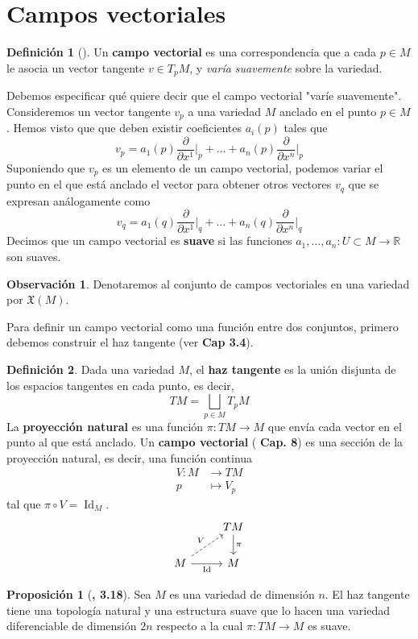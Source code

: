 \documentclass[spanish]{book}
\theoremstyle{definition}
\newtheorem*{defn}{Definición}
\newtheorem*{prop}{Proposición}
\newtheorem*{obs}{Observación}
\newcommand{\R}{\mathbb{R}}
\DeclareMathOperator{\Id}{Id}
\begin{document}
	\section{Campos vectoriales}\label{sec:campos-vectoriales}
	\begin{defn}[\cite{ONeill}]
		Un \textbf{campo vectorial} es una correspondencia que a cada $p\in M$ le asocia un vector tangente $v\in T_pM$, y \textit{varía suavemente} sobre la variedad.
	\end{defn}
	Debemos especificar qué quiere decir que el campo vectorial "varíe suavemente". Consideremos un vector tangente $v_p$ a una variedad $M$ anclado en el punto $p\in M$. Hemos visto que que deben existir coeficientes $a_i(p)$ tales que
	\[v_p=a_1(p)\frac{\partial}{\partial x^1}\Big|_p+\ldots+a_n(p)\frac{\partial}{\partial x^n}\Big|_p\]
	Suponiendo que $v_p$ es un elemento de un campo vectorial, podemos variar el punto en el que está anclado el vector para obtener otros vectores $v_q$ que se expresan análogamente como
	\[v_q=a_1(q)\frac{\partial}{\partial x^1}\Big|_q+\ldots+a_n(q)\frac{\partial}{\partial x^n}\Big|_q\]
	Decimos que un campo vectorial es \textbf{suave} si las funciones $a_1,\ldots,a_n:U\subset M\to\R$ son suaves.
	\begin{obs}
		Denotaremos al conjunto de campos vectoriales en una variedad por $\mathfrak{X}(M)$.
	\end{obs}
	Para definir un campo vectorial como una función entre dos conjuntos, primero debemos construir el haz tangente (ver \cite{Lee} \textbf{Cap 3.4}).
	\begin{defn}
		Dada una variedad $M$, el \textbf{haz tangente} es la unión disjunta de los espacios tangentes en cada punto, es decir,
		\[TM=\bigsqcup_{p\in M}T_pM\]
		La \textbf{proyección natural} es una función $\pi:TM\to M$ que envía cada vector en el punto al que está anclado.
		Un \textbf{campo vectorial} (\cite{Lee} \textbf{Cap. 8}) es una sección de la proyección natural, es decir, una función continua
		\begin{align*}
			V:M&\to TM\\
			p&\mapsto V_p
		\end{align*}
		tal que $\pi\circ V=\Id_M$.
		\[\begin{tikzcd}
			&TM\arrow{d}{\pi}\\
			M\arrow[dashed]{ur}{V}\arrow[swap]{r}{\Id}&M
		\end{tikzcd}\]
	\end{defn}
	\begin{prop}[\cite{Lee}\textbf{, 3.18}]
		Sea $M$ es una variedad de dimensión $n$. El haz tangente tiene una topología natural y una estructura suave que lo hacen una variedad diferenciable de dimensión $2n$ respecto a la cual $\pi:TM\to M$ es suave.
	\end{prop}
\end{document}
